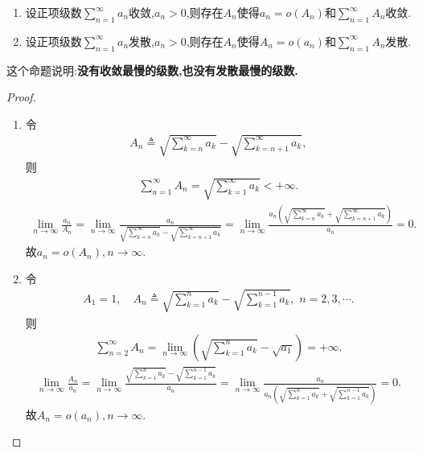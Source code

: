 \documentclass[../../main.tex]{subfiles}
\begin{document}
\begin{proposition}\label{proposition:没有收敛最慢的级数也没有发散最慢的级数}
\begin{enumerate}
\item 设正项级数$\sum\limits_{n=1}^\infty a_n$收敛,$a_n>0$,则存在$A_n$使得$a_n=o(A_n)$和$\sum\limits_{n=1}^\infty A_n$收敛.

\item 设正项级数$\sum\limits_{n=1}^\infty a_n$发散,$a_n>0$,则存在$A_n$使得$A_n=o(a_n)$和$\sum\limits_{n=1}^\infty A_n$发散.
\end{enumerate}
\end{proposition}
\begin{note}
这个命题说明:\textbf{没有收敛最慢的级数,也没有发散最慢的级数.}
\end{note}
\begin{proof}
\begin{enumerate}
\item 令
\begin{align*}
A_n\triangleq \sqrt{\sum_{k=n}^{\infty}{a_k}}-\sqrt{\sum_{k=n+1}^{\infty}{a_k}},
\end{align*}
则
\begin{align*}
\sum_{n=1}^{\infty}{A_n}=\sqrt{\sum_{k=1}^{\infty}{a_k}}<+\infty .
\end{align*}
\begin{align*}
\lim_{n\rightarrow \infty}\frac{a_n}{A_n}=\lim_{n\rightarrow \infty}\frac{a_n}{\sqrt{\sum\limits_{k=n}^{\infty}{a_k}}-\sqrt{\sum\limits_{k=n+1}^{\infty}{a_k}}}=\lim_{n\rightarrow \infty}\frac{a_n\left( \sqrt{\sum\limits_{k=n}^{\infty}{a_k}}+\sqrt{\sum\limits_{k=n+1}^{\infty}{a_k}} \right)}{a_n}=0.
\end{align*}
故$a_n=o\left( A_n \right) ,n\rightarrow \infty .$

\item 令
\begin{align*}
A_1=1,\quad A_n\triangleq \sqrt{\sum_{k=1}^n{a_k}}-\sqrt{\sum_{k=1}^{n-1}{a_k}},\,\,n=2,3,\cdots .
\end{align*}
则
\begin{align*}
\sum_{n=2}^{\infty}{A_n}=\lim_{n\rightarrow \infty}\left( \sqrt{\sum_{k=1}^n{a_k}}-\sqrt{a_1} \right) =+\infty .
\end{align*}
\begin{align*}
\lim_{n\rightarrow \infty}\frac{A_n}{a_n}=\lim_{n\rightarrow \infty}\frac{\sqrt{\sum\limits_{k=1}^n{a_k}}-\sqrt{\sum\limits_{k=1}^{n-1}{a_k}}}{a_n}=\lim_{n\rightarrow \infty}\frac{a_n}{a_n\left( \sqrt{\sum\limits_{k=1}^n{a_k}}+\sqrt{\sum\limits_{k=1}^{n-1}{a_k}} \right)}=0.
\end{align*}
故$A_n=o\left( a_n \right) ,n\rightarrow \infty .$
\end{enumerate}
\end{proof}
\end{document}

